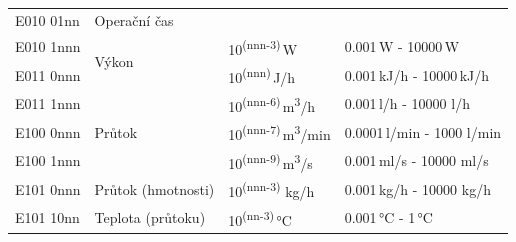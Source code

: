 \begin{table}[!ht]
{\begin{tabular}{|l|l|l|l|}
\multirow{2}{*}{E010 01nn}            & \multirow{2}{*}{Operační čas}            &                                                                                                                           & \multirow{2}{*}{}                   \\
                                      &                                           &                                                                                                                           &                                     \\ \hline
E010 1nnn                             & \multirow{2}{*}{Výkon}                                     & 10\textsuperscript{(nnn-3)}\,W                                                                                                               & 0.001\,W - 10000\,W                  \\ \cline{1-1} \cline{3-4} 
E011 0nnn                             &                                    & 10\textsuperscript{(nnn)}\,J/h                                                                                                               & 0.001\,kJ/h - 10000\,kJ/h            \\ \hline
E011 1nnn                             & \multirow{3}{*}{Průtok }                               & 10\textsuperscript{(nnn-6)}\,m\textsuperscript{3}/h                                                                                                            & 0.001\,l/h - 10000 l/h              \\ \cline{1-1} \cline{3-4}
E100 0nnn                             &                           & 10\textsuperscript{(nnn-7)}\,m\textsuperscript{3}/min                                                                                                          & 0.0001\,l/min - 1000 l/min          \\ \cline{1-1} \cline{3-4}
E100 1nnn                             &                          & 10\textsuperscript{(nnn-9)}\,m\textsuperscript{3}/s                                                                                                            & 0.001\,ml/s - 10000 ml/s            \\ \hline
E101 0nnn                             & Průtok (hmotnosti)                              & 10\textsuperscript{(nnn-3)} kg/h                                                                                                            & 0.001\,kg/h - 10000 kg/h            \\ \hline
E101 10nn                             & Teplota (průtoku)                           & 10\textsuperscript{(nn-3)}\,°C                                                                                                               & 0.001\,°C - 1\,°C                    \\ \hline

\end{tabular}}
\end{table}
